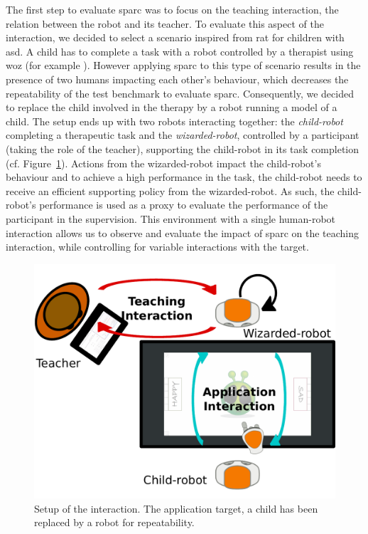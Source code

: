 The first step to evaluate \gls{sparc} was to focus on the teaching interaction, the relation between the robot and its teacher. To evaluate this aspect of the interaction, we decided to select a scenario inspired from \gls{rat} for children with \gls{asd}. A child has to complete a task with a robot controlled by a therapist using \gls{woz} (for example \citealt{vanderborght2012using}). However applying \gls{sparc} to this type of scenario results in the presence of two humans impacting each other's behaviour, which decreases the repeatability of the test benchmark to evaluate \gls{sparc}. Consequently, we decided to replace the child involved in the therapy by a robot running a model of a child. The setup ends up with two robots interacting together: the \emph{child-robot} completing a therapeutic task and the \emph{wizarded-robot}, controlled by a participant (taking the role of the teacher), supporting the child-robot in its task completion (cf. Figure~\ref{fig:woz_setup_diag}). Actions from the wizarded-robot impact the child-robot's behaviour and to achieve a high performance in the task, the child-robot needs to receive an efficient supporting policy from the wizarded-robot. As such, the child-robot's performance is used as a proxy to evaluate the performance of the participant in the supervision. This environment with a single human-robot interaction allows us to observe and evaluate the impact of \gls{sparc} on the teaching interaction, while controlling for variable interactions with the target.

\begin{figure}[ht]
	\centering
	\includegraphics[width=.8\textwidth]{setup_diag.pdf}
	\caption{Setup of the interaction. The application target, a child has been replaced by a robot for repeatability.}
	\label{fig:woz_setup_diag}
\end{figure}

